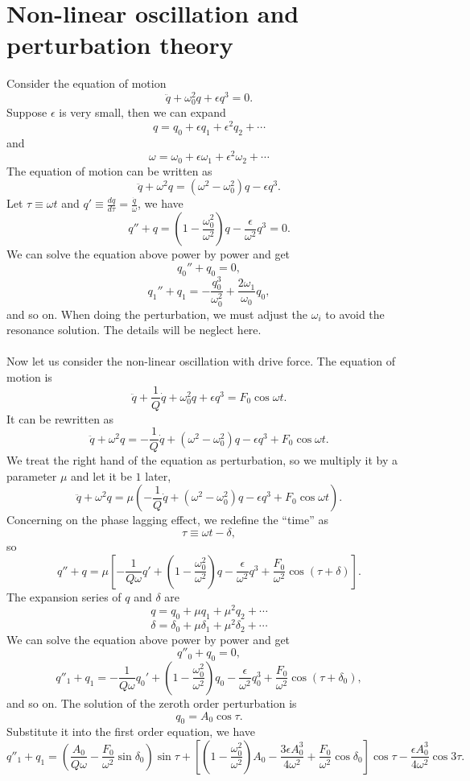 \section{Non-linear oscillation and perturbation theory}
Consider the equation of motion
\[\ddot{q} + \omega_0^2 q + \epsilon q^3 = 0.\]
Suppose $\epsilon$ is very small, then we can expand
\[q = q_0 + \epsilon q_1 + \epsilon^2 q_2 + \cdots \]
and
\[\omega = \omega_0 + \epsilon \omega_1 + \epsilon^2 \omega_2 + \cdots \]
The equation of motion can be written as
\[\ddot{q} + \omega^2 q = (\omega^2 -\omega_0^2)q - \epsilon q^3.\]
Let $\tau \equiv \omega t$ and $q' \equiv \frac{dq}{d\tau} = \frac{\dot{q}}{\omega}$, we have
\[q'' + q = (1- \frac{\omega_0^2}{\omega^2})q - \frac{\epsilon}{\omega^2} q^3 = 0.\]
We can solve the equation above power by power and get
\[q_0'' + q_0 = 0 ,\]
\[q_1'' + q_1 = -\frac{q_0^3}{\omega_0^2} + \frac{2\omega_1}{\omega_0}q_0, \]
and so on. 
When doing the perturbation, we must adjust the $\omega_i$ to avoid the resonance solution. The details will be neglect here.
\\ \\
Now let us consider the non-linear oscillation with drive force. The equation of motion is
\[\ddot{q} + \frac{1}{Q}\dot{q} + \omega_0^2 q + \epsilon q^3 = F_0 \cos \omega t.\]
It can be rewritten as
\[\ddot{q} + \omega^2 q = - \frac{1}{Q} \dot{q} + (\omega^2 - \omega_0^2)q - \epsilon q^3 + F_0\cos\omega t.\]
We treat the right hand of the equation as perturbation, so we multiply it by a parameter $\mu$ and let it be $1$ later,
\[\ddot{q} + \omega^2 q = \mu \left (- \frac{1}{Q} \dot{q} + (\omega^2 - \omega_0^2)q - \epsilon q^3 + F_0\cos\omega t \right ).\]
Concerning on the phase lagging effect, we redefine the ``time'' as 
\[\tau \equiv \omega t - \delta, \]
so 
\[q'' + q = \mu \left [ -\frac{1}{Q\omega} q' + \left ( 1- \frac{\omega_0^2}{\omega^2} \right ) q - \frac{\epsilon}{\omega^2} q^3 + \frac{F_0}{\omega^2} \cos (\tau + \delta) \right ].\]
The expansion series of $q$ and $\delta$ are
\[q = q_0 + \mu q_1 + \mu^2 q_2 + \cdots \]
\[\delta = \delta_0 + \mu \delta_1 + \mu^2 \delta_2 + \cdots \]
We can solve the equation above power by power and get
\[q''_0 + q_0 = 0,\]
\[q''_1 + q_1 =  -\frac{1}{Q\omega} q_0' + \left ( 1- \frac{\omega_0^2}{\omega^2} \right ) q_0 - \frac{\epsilon}{\omega^2} q_0^3 + \frac{F_0}{\omega^2} \cos (\tau + \delta_0), \]
and so on. 
The solution of the zeroth order perturbation is
\[q_0 = A_0 \cos\tau.\]
Substitute it into the first order equation, we have
\[q''_1 + q_1 = \left ( \frac{A_0}{Q\omega} - \frac{F_0}{\omega^2} \sin\delta_0 \right ) \sin\tau + \left [ \left ( 1 - \frac{\omega_0^2}{\omega^2}\right ) A_0 - \frac{3\epsilon A_0^3}{4\omega^2} + \frac{F_0}{\omega^2}\cos\delta_0 \right ] \cos\tau - \frac{\epsilon A_0^3}{4\omega^2} \cos 3\tau.\]
